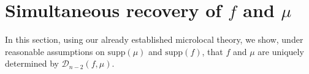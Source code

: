\documentclass[a4paper,12pt]{amsart}
\numberwithin{equation}{section}
\theoremstyle{plain}
\numberwithin{theorem}{section}
\theoremstyle{definition}
\theoremstyle{remark}
\theoremstyle{remark}
\theoremstyle{remark}
\newcommand{\paren}[1]{\left(#1\right)}               %
\newcommand{\tred}[1]{{\color{red}#1}}
\newcommand{\Cc}{\mathcal{C}}
\newcommand{\WF}{\mathrm{WF}}
\newcommand{\seanc}[1]{\begin{quotation}\textbf{Sean's comment:\
}{\textit{#1}}\end{quotation}}
\begin{document}
{%



\section{Simultaneous recovery of $f$ and $\mu$}\label{sec:sim}
In this section, using our already established microlocal theory,  we show, under reasonable assumptions on $\text{supp}(\mu)$ and $\text{supp}(f)$, that $f$ and $\mu$ are uniquely determined by $\mathcal{D}_{n-2}(f,\mu)$.

}
\end{document}
